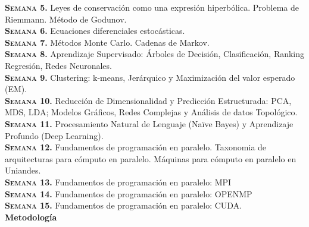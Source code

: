 \documentclass[letterpaper,10pt,onecolumn]{article}
\begin{document}
\noindent\textbf{\textsc{Semana 5.}}
Leyes de conservaci\'on como una expresi\'on hiperb\'olica. Problema
de Riemmann. M\'etodo de Godunov.
\\[-0.3cm] 

\noindent\textbf{\textsc{Semana 6.}} Ecuaciones diferenciales estoc\'asticas.
\\[-0.3cm]  

\noindent\textbf{\textsc{Semana 7.}} M\'etodos Monte Carlo. Cadenas de
Markov. 
\\[-0.3cm]  

\noindent\textbf{\textsc{Semana 8.}} Aprendizaje Supervisado: Árboles de Decisión, Clasificación, Ranking Regresión, Redes Neuronales.
\\[-0.3cm] 

\noindent\textbf{\textsc{Semana 9.}} Clustering: k-means, Jerárquico y Maximización del valor esperado (EM).
\\[-0.3cm] 

\noindent\textbf{\textsc{Semana 10.}}  Reducción de Dimensionalidad y Predicción Estructurada: PCA, MDS, LDA; Modelos Gráficos, Redes Complejas y Análisis de datos Topológico.
\\[-0.3cm] 

\noindent\textbf{\textsc{Semana 11.}}  Procesamiento Natural de Lenguaje (Naïve Bayes) y Aprendizaje Profundo (Deep Learning).
\\[-0.3cm]  

\noindent\textbf{\textsc{Semana 12.}} 
Fundamentos de programaci\'on en paralelo. Taxonomia de arquitecturas
para c\'omputo en paralelo. M\'aquinas para c\'omputo en paralelo en
Uniandes. 
\\[-0.3cm]  

\noindent\textbf{\textsc{Semana 13.}} 
Fundamentos de programaci\'on en paralelo: MPI
\\[-0.3cm] 

\noindent\textbf{\textsc{Semana 14.}} 
Fundamentos de programaci\'on en paralelo: OPENMP
\\[-0.3cm] 

\noindent\textbf{\textsc{Semana 15.}} Fundamentos de programaci\'on en
paralelo: CUDA.
\\[-0.1cm]  


\noindent\textbf{\large {} \quad
  Metodolog\'ia}\\[-0.2cm] 

\end{document}

